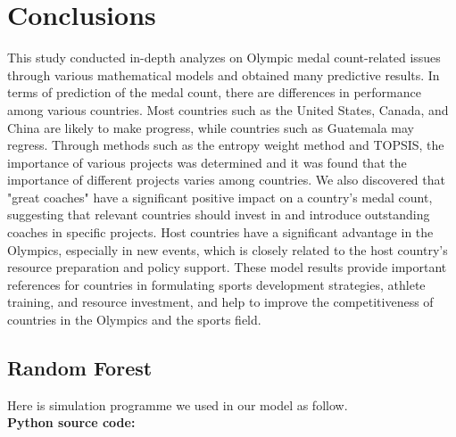 \documentclass{mcmthesis}  %
\begin{document}
\section{Conclusions}  %
\hspace*{1.5em}This study conducted in-depth analyzes on Olympic medal count-related issues through various mathematical models and obtained many predictive results. In terms of prediction of the medal count, there are differences in performance among various countries. Most countries such as the United States, Canada, and China are likely to make progress, while countries such as Guatemala may regress. Through methods such as the entropy weight method and TOPSIS, the importance of various projects was determined and it was found that the importance of different projects varies among countries. We also discovered that "great coaches" have a significant positive impact on a country's medal count, suggesting that relevant countries should invest in and introduce outstanding coaches in specific projects. Host countries have a significant advantage in the Olympics, especially in new events, which is closely related to the host country's resource preparation and policy support. These model results provide important references for countries in formulating sports development strategies, athlete training, and resource investment, and help to improve the competitiveness of countries in the Olympics and the sports field.
\newenvironment{aitool}[2]{
    \subsection{#1 (#2)}
}{}

\begin{appendices}  %

\section{Random Forest}  %

Here is simulation programme we used in our model as follow.\\
\textbf{Python source code:}



\end{appendices}  %
\newenvironment{queryoutput}{
    \begin{enumerate}
}{
    \end{enumerate}
}
\end{document}
